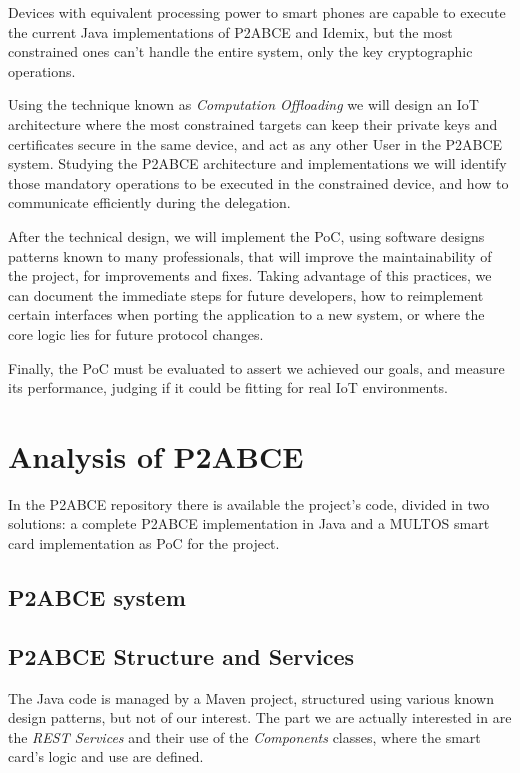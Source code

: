 Devices with equivalent processing power to smart phones are capable to execute the current Java implementations of P2ABCE and Idemix, but the most constrained ones can't handle the entire system, only the key cryptographic operations.

Using the technique known as \textit{Computation Offloading} we will design an IoT architecture where the most constrained targets can keep their private keys and certificates secure in the same device, and act as any other User in the P2ABCE system. Studying the P2ABCE architecture and implementations we will identify those mandatory operations to be executed in the constrained device, and how to communicate efficiently during the delegation.

After the technical design, we will implement the PoC, using software designs patterns known to many professionals, that will improve the maintainability of the project, for improvements and fixes. Taking advantage of this practices, we can document the immediate steps for future developers, how to reimplement certain interfaces when porting the application to a new system, or where the core logic lies for future protocol changes.

Finally, the PoC must be evaluated to assert we achieved our goals, and measure its performance, judging if it could be fitting for real IoT environments.



\section{Analysis of P2ABCE}

In the P2ABCE repository \citep{p2abcurl} there is available the project's code, divided in two solutions: a complete P2ABCE implementation in Java and a MULTOS smart card implementation as PoC for the project.


\subsection{P2ABCE system}


\subsection{P2ABCE Structure and Services}
The Java code is managed by a Maven project, structured using various known design patterns, but not of our interest. The part we are actually interested in are the \textit{REST Services} and their use of the \textit{Components} classes, where the smart card's logic and use are defined.

